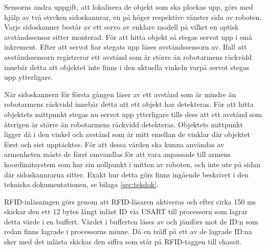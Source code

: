 Sensorns andra uppgift, att lokalisera de objekt som ska plockas upp, görs med hjälp av två stycken sidoskannrar, en på höger respektive vänster sida av roboten. Varje sidoskanner består av ett servo av enklare modell på vilket en optisk avståndssensor sitter monterad. För att hitta objekt så stegas servot upp i små inkrement. Efter att servot har stegats upp läses avståndssensorn av. Ifall att avståndssensorn registrerar ett avstånd som är större än robotarmens räckvidd innebär detta att objektet inte finns i den aktuella vinkeln varpå servot stegas upp ytterligare.

När sidoskannern för första gången läser av ett avstånd som är mindre än robotarmens räckvidd innebär detta att ett objekt har detekteras. För att hitta objektets mittpunkt stegas nu servot upp ytterligare tills dess att ett avstånd som återigen är större än robotarmens räckvidd detekteras. Objektets mittpunkt ligger då i den vinkel och avstånd som är mitt emellan de vinklar där objektet först och sist upptäcktes. För att dessa värden ska kunna användas av armenheten måste de först omvandlas för att vara anpassade till armens koordinatsystem som har sin nollpunkt i mitten av roboten, och inte ute på sidan där sidoskannrarna sitter. Exakt hur detta görs finns ingående beskrivet i den tekniska dokumentationen, se bilaga \ref{sec:tekdok}.

RFID-inläsningen görs genom att RFID-läsaren aktiveras och efter cirka 150 ms skickar den ett 12 bytes långt inläst ID via USART till processorn som lagrar detta värde i en buffert. Värdet i bufferten läses av och jämförs mot de ID:n som redan finns lagrade i processorns minne. Då en träff på ett av de lagrade ID:na sker med det inlästa skickas den siffra som står på RFID-taggen till chassit. 




